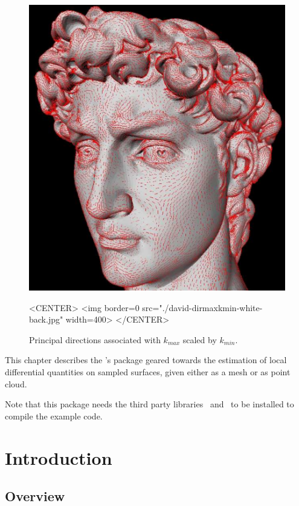 


\begin{figure}[!ht]
\begin{ccTexOnly}
\centerline{
\includegraphics[width=.5\linewidth]{Jet_fitting_3/david-dirmaxkmin-jpg-white-back}}
\end{ccTexOnly}
\caption{Principal directions associated with $k_{max}$ scaled by $k_{min}$.}

\begin{ccHtmlOnly}
<CENTER> <img border=0 src="./david-dirmaxkmin-white-back.jpg" width=400>
</CENTER>
\end{ccHtmlOnly}
\label{fig:jet3:fig-david}
\end{figure}

This chapter describes the \cgal's package geared towards the
estimation of local differential quantities on sampled surfaces, given
either as a mesh or as point cloud.

Note that this package needs the third party libraries
\ccThirdPartyLapack\ and \ccThirdPartyBlas\ to be installed to compile
the example code.

\section{Introduction}
\label{sec:intro}

\subsection{Overview}

